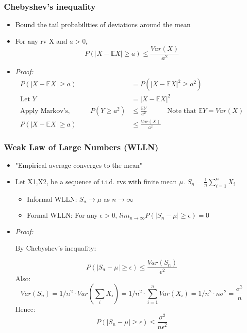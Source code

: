 \documentclass[12pt]{article}
\begin{document}
\subsubsection{Chebyshev's inequality}
\begin{itemize}
\item Bound the tail probabilities of deviations around the mean
\item For any rv X and $a>0$,
$$ P(|X-\mathbb{E}X| \ge a) \le \frac{Var(X)}{a^2}$$
\item \textit{Proof:}
\begin{align*}
P(|X-\mathbb{E}X| \ge a) &= P(|X-\mathbb{E}X|^2 \ge a^2)\\
\textrm{Let } Y &= |X-\mathbb{E}X|^2 \\
\textrm{Apply Markov's,} \qquad \quad P(Y \ge a^2) &\le \frac{\mathbb{E}Y}{a^2} \qquad \quad \textrm{Note that }  \mathbb{E}Y = Var(X) \\
P(|X-\mathbb{E}X| \ge a) &\le \frac{Var(X)}{a^2}
\end{align*}
\end{itemize}

\subsubsection{Weak Law of Large Numbers (WLLN)}
\begin{itemize}
\item "Empirical average converges to the mean"
\item Let X1,X2, be a sequence of i.i.d. rvs with finite mean $\mu$. $S_n = \frac{1}{n}\sum_{i=1}^nX_i$
\begin{itemize}
\item Informal WLLN: $S_n\rightarrow\mu$ as $n\rightarrow\infty$
\item Formal WLLN: For any $\epsilon > 0$, $lim_{n\rightarrow\infty}P(|S_n-\mu| \ge \epsilon) = 0$
\end{itemize}
\item \textit{Proof:} 

By Chebyshev's inequality:

$$P(|S_n-\mu| \ge \epsilon) \le \frac{Var(S_n)}{\epsilon^2} $$
Also:
$$ Var(S_n) = 1/n^2\cdot Var(\sum_i X_i) = 1/n^2 \cdot \sum_{i=1}^nVar(X_i)=1/n^2\cdot n\sigma^2 = \frac{\sigma^2}{n}$$
Hence:
$$P(|S_n-\mu| \ge \epsilon) \le \frac{\sigma^2}{n\epsilon^2}$$
\end{itemize}
\end{document}

